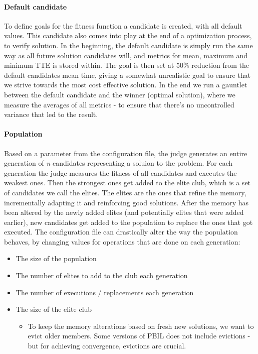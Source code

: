 \documentclass[a4paper,english]{report}
\begin{document}
		\paragraph{Default candidate}
		To define goals for the fitness function a candidate is created, with all default values. This candidate also comes into play at the end of a optimization process, to verify solution. In the beginning, the default candidate is simply run the same way as all future solution candidates will, and metrics for mean, maximum and minimum TTE is stored within. The goal is then set at 50\% reduction from the default candidates mean time, giving a somewhat unrealistic goal to ensure that we strive towards the most cost effective solution. In the end we run a gauntlet between the default candidate and the winner (optimal solution), where we measure the averages of all metrics - to ensure that there's no uncontrolled variance that led to the result.
		\paragraph{Population}
		Based on a parameter from the configuration file, the judge generates an entire generation of \textit{n} candidates representing a soluion to the problem. For each generation the judge measures the fitness of all candidates and executes the weakest ones. Then the strongest ones get added to the elite club, which is a set of candidates we call the elites. The elites are the ones that refine the memory, incrementally adapting it and reinforcing good solutions. After the memory has been altered by the newly added elites (and potentially elites that were added earlier), new candidates get added to the population to replace the ones that got executed. The configuration file can drastically alter the way the population behaves, by changing values for operations that are done on each generation:
		\begin{itemize}
			\item The size of the population
			\item The number of elites to add to the club each generation
			\item The number of executions / replacements each generation
			\item The size of the elite club
			   \begin{itemize}
				\item To keep the memory alterations based on fresh new solutions, we want to evict older members. Some versions of PBIL does not include evictions - but for achieving convergence, evictions are crucial.
				\end{itemize}
		\end{itemize}
\end{document}
